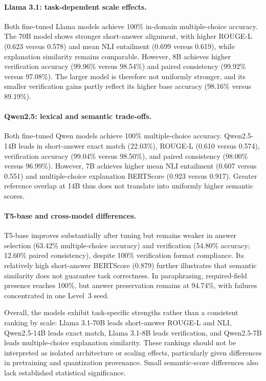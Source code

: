 \documentclass[a4paper,fleqn]{cas-sc}
\begin{document}
\paragraph{Llama 3.1: task-dependent scale effects.}
Both fine-tuned Llama models achieve 100\% in-domain multiple-choice accuracy. The 70B model shows stronger short-answer alignment, with higher ROUGE-L (0.623 versus 0.578) and mean NLI entailment (0.699 versus 0.619), while explanation similarity remains comparable. However, 8B achieves higher verification accuracy (99.96\% versus 98.54\%) and paired consistency (99.92\% versus 97.08\%). The larger model is therefore not uniformly stronger, and its smaller verification gains partly reflect its higher base accuracy (98.16\% versus 89.19\%).

\paragraph{Qwen2.5: lexical and semantic trade-offs.}
Both fine-tuned Qwen models achieve 100\% multiple-choice accuracy. Qwen2.5-14B leads in short-answer exact match (22.03\%), ROUGE-L (0.610 versus 0.574), verification accuracy (99.04\% versus 98.50\%), and paired consistency (98.00\% versus 96.99\%). However, 7B achieves higher mean NLI entailment (0.607 versus 0.551) and multiple-choice explanation BERTScore (0.923 versus 0.917). Greater reference overlap at 14B thus does not translate into uniformly higher semantic scores.

\paragraph{T5-base and cross-model differences.}
T5-base improves substantially after tuning but remains weaker in answer selection (63.42\% multiple-choice accuracy) and verification (54.80\% accuracy; 12.60\% paired consistency), despite 100\% verification format compliance. Its relatively high short-answer BERTScore (0.879) further illustrates that semantic similarity does not guarantee task correctness. In paraphrasing, required-field presence reaches 100\%, but answer preservation remains at 94.74\%, with failures concentrated in one Level~3 seed.

Overall, the models exhibit task-specific strengths rather than a consistent ranking by scale: Llama 3.1-70B leads short-answer ROUGE-L and NLI, Qwen2.5-14B leads exact match, Llama 3.1-8B leads verification, and Qwen2.5-7B leads multiple-choice explanation similarity. These rankings should not be interpreted as isolated architecture or scaling effects, particularly given differences in pretraining and quantization provenance. Small semantic-score differences also lack established statistical significance.
\end{document}
